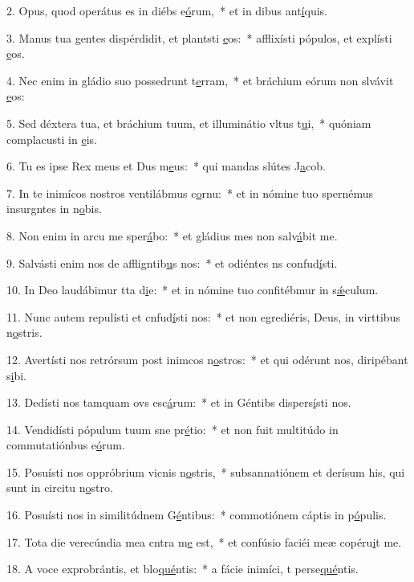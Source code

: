 2. Opus, quod operátus es in diébs e\uline{ó}rum,~* et in dibus ant\uline{í}quis.\par 
3. Manus tua gentes dispérdidit, et plantsti \uline{e}os:~* afflixísti pópulos, et explísti \uline{e}os.\par 
4. Nec enim in gládio suo possedrunt t\uline{e}rram,~* et bráchium eórum non slvávit \uline{e}os:\par 
5. Sed déxtera tua, et bráchium tuum, et illuminátio vltus t\uline{u}i,~* quóniam complacusti in \uline{e}is.\par 
6. Tu es ipse Rex meus et Dus m\uline{e}us:~* qui mandas slútes J\uline{a}cob.\par 
7. In te inimícos nostros ventilábmus c\uline{o}rnu:~* et in nómine tuo spernémus insurgntes in n\uline{o}bis.\par 
8. Non enim in arcu me sper\uline{á}bo:~* et gládius mes non salv\uline{á}bit me.\par 
9. Salvásti enim nos de affligntib\uline{u}s nos:~* et odiéntes ns confud\uline{í}sti.\par 
10. In Deo laudábimur tta d\uline{i}e:~* et in nómine tuo confitébmur in s\uline{ǽ}culum.\par 
11. Nunc autem repulísti et cnfud\uline{í}sti nos:~* et non egrediéris, Deus, in virttibus n\uline{o}stris.\par 
12. Avertísti nos retrórsum post inimcos n\uline{o}stros:~* et qui odérunt nos, diripébant s\uline{i}bi.\par 
13. Dedísti nos tamquam ovs esc\uline{á}rum:~* et in Géntibs dispers\uline{í}sti nos.\par 
14. Vendidísti pópulum tuum sne pr\uline{é}tio:~* et non fuit multitúdo in commutatiónbus e\uline{ó}rum.\par 
15. Posuísti nos oppróbrium vicnis n\uline{o}stris,~* subsannatiónem et derísum his, qui sunt in circitu n\uline{o}stro.\par 
16. Posuísti nos in similitúdnem G\uline{é}ntibus:~* commotiónem cáptis in p\uline{ó}pulis.\par 
17. Tota die verecúndia mea cntra m\uline{e} est,~* et confúsio faciéi meæ copéru\uline{i}t me.\par 
18. A voce exprobrántis, et blo\uline{qué}ntis:~* a fácie inimíci, t perse\uline{qué}ntis.\par 
